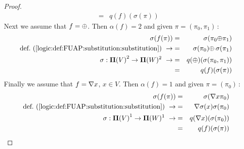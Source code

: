 \begin{proof}
\begin{eqnarray*}
    &=&q(f)(\sigma(\pi))
    \end{eqnarray*}
Next we assume that $f=\mbox{$\oplus$}$. Then $\alpha(f)=2$ and given
$\pi=(\pi_{0},\pi_{1})$\,:
    \begin{eqnarray*}
    \sigma(f(\pi))&=&\sigma(\pi_{0}\pon\pi_{1})\\
    \mbox{def.~(\ref{logic:def:FUAP:substitution:substitution})}\ \rightarrow
    &=&\sigma(\pi_{0})\pon\,\sigma(\pi_{1})\\
    \sigma:\pvs^{2}\to{\bf\Pi}(W)^{2}\ \rightarrow&=&q(\pon)(\sigma(\pi_{0},\pi_{1}))\\
    &=&q(f)(\sigma(\pi))
    \end{eqnarray*}
Finally we assume that $f=\mbox{$\nabla$} x$, $x\in V$. Then $\alpha(f)=1$ and
given $\pi=(\pi_{0})$\,:
    \begin{eqnarray*}
    \sigma(f(\pi))&=&\sigma(\gen x\pi_{0})\\
    \mbox{def.~(\ref{logic:def:FUAP:substitution:substitution})}\ \rightarrow
    &=&\gen\sigma(x)\sigma(\pi_{0})\\
    \sigma:\pvs^{1}\to{\bf\Pi}(W)^{1}\ \rightarrow
    &=&q(\gen x)(\sigma(\pi_{0}))\\
    &=&q(f)(\sigma(\pi))
    \end{eqnarray*}
\end{proof}

